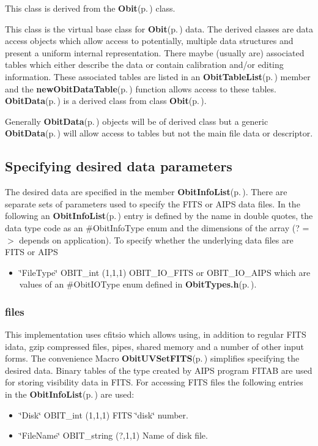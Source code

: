 This class is derived from the {\bf Obit}{\rm (p.\,\pageref{structObit})} class.

This class is the virtual base class for {\bf Obit}{\rm (p.\,\pageref{structObit})} data. The derived classes are data access objects which allow access to potentially, multiple data structures and present a uniform internal representation. There maybe (usually are) associated tables which either describe the data or contain calibration and/or editing information. These associated tables are listed in an {\bf Obit\-Table\-List}{\rm (p.\,\pageref{structObitTableList})} member and the {\bf new\-Obit\-Data\-Table}{\rm (p.\,\pageref{ObitData_8c_a19})} function allows access to these tables. {\bf Obit\-Data}{\rm (p.\,\pageref{structObitData})} is a derived class from class {\bf Obit}{\rm (p.\,\pageref{structObit})}.

Generally {\bf Obit\-Data}{\rm (p.\,\pageref{structObitData})} objects will be of derived class but a generic {\bf Obit\-Data}{\rm (p.\,\pageref{structObitData})} will allow access to tables but not the main file data or descriptor.\subsection{Specifying desired data parameters}\label{ObitData_8h_ObitDataSpecification}
The desired data are specified in the member {\bf Obit\-Info\-List}{\rm (p.\,\pageref{structObitInfoList})}. There are separate sets of parameters used to specify the FITS or AIPS data files. In the following an {\bf Obit\-Info\-List}{\rm (p.\,\pageref{structObitInfoList})} entry is defined by the name in double quotes, the data type code as an \#Obit\-Info\-Type enum and the dimensions of the array (? =$>$ depends on application). To specify whether the underlying data files are FITS or AIPS \begin{itemize}
\item \char`\"{}File\-Type\char`\"{} OBIT\_\-int (1,1,1) OBIT\_\-IO\_\-FITS or OBIT\_\-IO\_\-AIPS which are values of an \#Obit\-IOType enum defined in {\bf Obit\-Types.h}{\rm (p.\,\pageref{ObitTypes_8h})}.\end{itemize}
\subsubsection{files}\label{ObitData_8h_FITS}
This implementation uses cfitsio which allows using, in addition to regular FITS idata, gzip compressed files, pipes, shared memory and a number of other input forms. The convenience Macro {\bf Obit\-UVSet\-FITS}{\rm (p.\,\pageref{ObitUV_8h_a3})} simplifies specifying the desired data. Binary tables of the type created by AIPS program FITAB are used for storing visibility data in FITS. For accessing FITS files the following entries in the {\bf Obit\-Info\-List}{\rm (p.\,\pageref{structObitInfoList})} are used: \begin{itemize}
\item \char`\"{}Disk\char`\"{} OBIT\_\-int (1,1,1) FITS \char`\"{}disk\char`\"{} number. \item \char`\"{}File\-Name\char`\"{} OBIT\_\-string (?,1,1) Name of disk file.\end{itemize}
